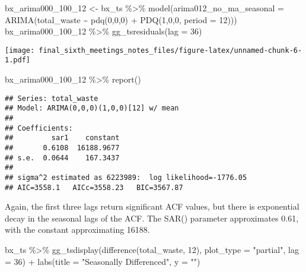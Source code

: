 \documentclass[
]{article}
\newenvironment{Shaded}{\begin{snugshade}}{\end{snugshade}}
\newcommand{\AttributeTok}[1]{\textcolor[rgb]{0.77,0.63,0.00}{#1}}
\newcommand{\DecValTok}[1]{\textcolor[rgb]{0.00,0.00,0.81}{#1}}
\newcommand{\FunctionTok}[1]{\textcolor[rgb]{0.00,0.00,0.00}{#1}}
\newcommand{\NormalTok}[1]{#1}
\newcommand{\OtherTok}[1]{\textcolor[rgb]{0.56,0.35,0.01}{#1}}
\newcommand{\SpecialCharTok}[1]{\textcolor[rgb]{0.00,0.00,0.00}{#1}}
\newcommand{\StringTok}[1]{\textcolor[rgb]{0.31,0.60,0.02}{#1}}
\begin{document}
\begin{Shaded}
\begin{Highlighting}[]
\NormalTok{bx\_arima000\_100\_12 }\OtherTok{\textless{}{-}}\NormalTok{ bx\_ts }\SpecialCharTok{\%\textgreater{}\%} \FunctionTok{model}\NormalTok{(}\AttributeTok{arima012\_no\_ma\_seasonal =} \FunctionTok{ARIMA}\NormalTok{(total\_waste }\SpecialCharTok{\textasciitilde{}} \FunctionTok{pdq}\NormalTok{(}\DecValTok{0}\NormalTok{,}\DecValTok{0}\NormalTok{,}\DecValTok{0}\NormalTok{) }\SpecialCharTok{+} \FunctionTok{PDQ}\NormalTok{(}\DecValTok{1}\NormalTok{,}\DecValTok{0}\NormalTok{,}\DecValTok{0}\NormalTok{, }\AttributeTok{period =} \DecValTok{12}\NormalTok{))) }
\NormalTok{bx\_arima000\_100\_12 }\SpecialCharTok{\%\textgreater{}\%} \FunctionTok{gg\_tsresiduals}\NormalTok{(}\AttributeTok{lag =} \DecValTok{36}\NormalTok{)}
\end{Highlighting}
\end{Shaded}

\texttt{[image: final\_sixth\_meetings\_notes\_files/figure-latex/unnamed-chunk-6-1.pdf]}

\begin{Shaded}
\begin{Highlighting}[]
\NormalTok{bx\_arima000\_100\_12 }\SpecialCharTok{\%\textgreater{}\%} \FunctionTok{report}\NormalTok{()}
\end{Highlighting}
\end{Shaded}

\begin{verbatim}
## Series: total_waste 
## Model: ARIMA(0,0,0)(1,0,0)[12] w/ mean 
## 
## Coefficients:
##         sar1    constant
##       0.6108  16188.9677
## s.e.  0.0644    167.3437
## 
## sigma^2 estimated as 6223989:  log likelihood=-1776.05
## AIC=3558.1   AICc=3558.23   BIC=3567.87
\end{verbatim}

Again, the first three lags return significant ACF values, but there is
exponential decay in the seasonal lags of the ACF. The SAR() parameter
approximates 0.61, with the constant approximating 16188.

\begin{Shaded}
\begin{Highlighting}[]
\NormalTok{bx\_ts }\SpecialCharTok{\%\textgreater{}\%} 
  \FunctionTok{gg\_tsdisplay}\NormalTok{(}\FunctionTok{difference}\NormalTok{(total\_waste, }\DecValTok{12}\NormalTok{),}
               \AttributeTok{plot\_type =} \StringTok{"partial"}\NormalTok{, }\AttributeTok{lag =} \DecValTok{36}\NormalTok{) }\SpecialCharTok{+}
  \FunctionTok{labs}\NormalTok{(}\AttributeTok{title =} \StringTok{"Seasonally Differenced"}\NormalTok{, }\AttributeTok{y =} \StringTok{""}\NormalTok{)}
\end{Highlighting}
\end{Shaded}
\end{document}
